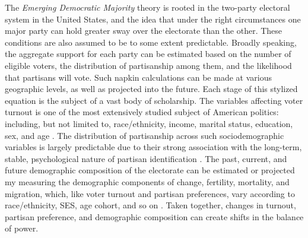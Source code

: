 The \textit{Emerging Democratic Majority} theory is rooted in the two-party electoral system in the United States, and the idea that under the right circumstances one major party can hold greater sway over the electorate than the other. These conditions are also assumed to be to some extent predictable. Broadly speaking, the aggregate support for each party can be estimated based on the number of eligible voters, the distribution of partisanship among them, and the likelihood that partisans will vote. Such napkin calculations can be made at various geographic levels, as well as projected into the future. Each stage of this stylized equation is the subject of a vast body of scholarship. The variables affecting voter turnout is one of the most extensively studied subject of American politics: including, but not limited to, race/ethnicity, income, marital status, education, sex, and age \citep{verba_voice_1995, wolfinger_who_1980, niemi_controversies_1984}. The distribution of partisanship across such sociodemographic variables is largely predictable due to their strong association with the long-term, stable, psychological nature of partisan identification \citep{campbell_american_1960, converse_time_1969, green_partisan_2008}. The past, current, and future demographic composition of the electorate can be estimated or projected my measuring the demographic components of change, fertility, mortality, and migration, which, like voter turnout and partisan preferences, vary according to race/ethnicity, SES, age cohort, and so on \citep{shryock_methods_1975, rowland_demographic_2003, smith_state_2006}. Taken together, changes in turnout, partisan preference, and demographic composition can create shifts in the balance of power. 

